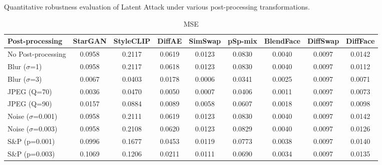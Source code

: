 \documentclass{article}
\begin{document}
\begin{table}[h!]
\caption{Quantitative robustness evaluation of Latent Attack under various post-processing transformations.}
\label{tab:robust_leat}
\centering
\small

\begin{subtable}{\textwidth}
\caption{MSE}
\centering
\scriptsize
\begin{tabular}{lcccccccc}
\toprule
\textbf{Post-processing} & StarGAN & StyleCLIP & DiffAE & SimSwap & pSp-mix & BlendFace & DiffSwap & DiffFace \\
\midrule
No Post-processing & 0.0958 & 0.2117 & 0.0619 & 0.0123 & 0.0830 & 0.0040 & 0.0097 & 0.0142 \\
\midrule
Blur ($\sigma$=1) & 0.0958 & 0.2117 & 0.0618 & 0.0123 & 0.0830 & 0.0040 & 0.0097 & 0.0112 \\
Blur ($\sigma$=3) & 0.0067 & 0.0403 & 0.0178 & 0.0006 & 0.0341 & 0.0025 & 0.0097 & 0.0071 \\
JPEG (Q=70) & 0.0036 & 0.0470 & 0.0050 & 0.0007 & 0.0406 & 0.0011 & 0.0097 & 0.0073 \\
JPEG (Q=90) & 0.0157 & 0.0884 & 0.0089 & 0.0058 & 0.0607 & 0.0018 & 0.0097 & 0.0098 \\
Noise ($\sigma$=0.001) & 0.0958 & 0.2111 & 0.0619 & 0.0123 & 0.0830 & 0.0040 & 0.0097 & 0.0142 \\
Noise ($\sigma$=0.003) & 0.0958 & 0.2108 & 0.0620 & 0.0123 & 0.0829 & 0.0040 & 0.0097 & 0.0126 \\
S\&P (p=0.001) & 0.0996 & 0.1677 & 0.0453 & 0.0119 & 0.0773 & 0.0038 & 0.0097 & 0.0140 \\
S\&P (p=0.003) & 0.1069 & 0.1206 & 0.0211 & 0.0111 & 0.0690 & 0.0034 & 0.0097 & 0.0135 \\
\bottomrule
\end{tabular}
\end{subtable}


\end{table}
\end{document}
